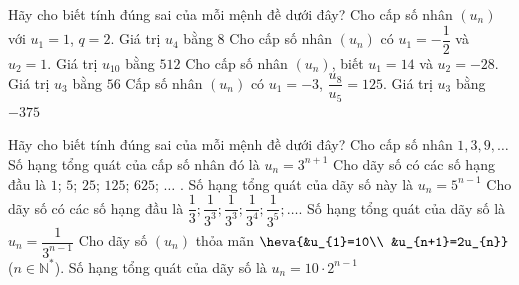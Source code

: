 

\begin{ex}%
  Hãy cho biết tính đúng sai của mỗi mệnh đề dưới đây?
 \choiceTF 
  {\True Cho cấp số  nhân $\left(u_n\right)$ với $u_1=1$, $q=2$. Giá trị $u_4$ bằng $8$}
  {Cho cấp số  nhân $(u_n)$ có $u_1=-\dfrac{1}{2}$ và $u_2=1$. Giá trị $u_{10}$ bằng $512$}
  {\True Cho cấp số nhân $\left(u_n \right)$, biết $u_1=14$ và $u_2=-28$.  Giá trị $u_{3}$ bằng $56$}
  {Cấp số nhân $(u_n)$ có $u_1=-3$, $\dfrac{u_8}{u_5}=125$.  Giá trị $u_3$ bằng $-375$}
\end{ex}

\begin{ex}%
 Hãy cho biết tính đúng sai của mỗi mệnh  đề dưới đây?
 \choiceTF 
  {Cho cấp số nhân $1,3,9,\dots$  Số hạng tổng quát của cấp số nhân đó là $u_n=3^{n+1}$}
  {\True Cho dãy số có các số hạng đầu là  $1$; $5$; $25$; $125$; $625$; $\ldots$ . Số hạng tổng quát của dãy số này là $u_n=5^{n-1}$}
  {Cho dãy số có các số hạng đầu là $\dfrac{1}{3}; \dfrac{1}{3^{3}}; \dfrac{1}{3^{3}}; \dfrac{1}{3^4}; \dfrac{1}{3^5}; \ldots $. Số  hạng tổng quát của dãy số là $u_{n}=\dfrac{1}{3^{n-1}}$}
  {\True  Cho dãy số $(u_{n})$ thỏa mãn $\heva{&u_{1}=10\\ &u_{n+1}=2u_{n}}$ ($n\in\mathbb{N}^{*}$). Số hạng tổng quát của dãy số là $u_{n}=10\cdot 2^{n-1}$}
\end{ex}


